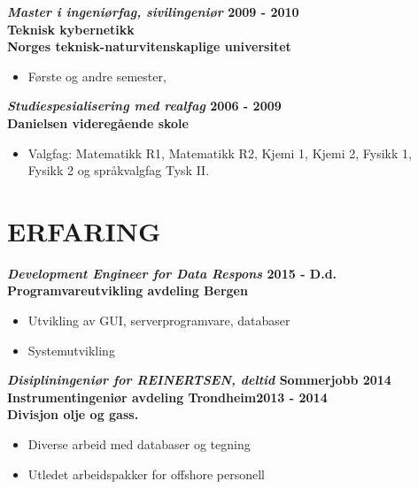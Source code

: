 \documentclass[margin, 10pt, norsk]{res} %
\begin{document}
\begin{resume}
\textbf{\emph{Master i ingeniørfag, sivilingeniør} \hfill 2009 - 2010
\\Teknisk kybernetikk  \\
Norges teknisk-naturvitenskaplige universitet} 
\begin{itemize} \itemsep -2pt %
\item Første og andre semester,
\end{itemize}

\textbf{\emph{Studiespesialisering med realfag }\hfill 2006 - 2009\\
Danielsen videregående skole}
\begin{itemize} \itemsep -2pt %
\item Valgfag: Matematikk R1, Matematikk R2, Kjemi 1, Kjemi 2, Fysikk 1,\\Fysikk 2 og språkvalgfag Tysk II.
\end{itemize}

 
\hspace{5mm}  

\section{ERFARING}

\textbf{\emph{Development Engineer for Data Respons} \hfill 2015 - D.d.\\
Programvareutvikling avdeling Bergen}

\begin{itemize} \itemsep -2pt %
\item Utvikling av GUI, serverprogramvare, databaser
\item Systemutvikling 
\end{itemize}

\textbf{\emph{Disipliningeniør for REINERTSEN, deltid} \hfill Sommerjobb 2014\\
Instrumentingeniør avdeling Trondheim\hfill 2013 - 2014\\
Divisjon olje og gass.}

\begin{itemize} \itemsep -2pt %
\item Diverse arbeid med databaser og tegning
\item Utledet arbeidspakker for offshore personell 
\end{itemize}


\end{resume}
\end{document}
